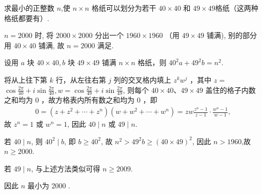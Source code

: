 \begin{example}
	求最小的正整数 $n$,使 $n \times n$ 格纸可以划分为若干 $40 \times 40$ 和 $49 \times 49$格纸（这两种格纸都要有）.
\end{example}
\begin{solution}
	$n=2000$ 时, 将 $2000 \times 2000$ 分出一个 $1960 \times 1960$ （用 $49 \times 49$ 铺满), 别的部分用 $40 \times 40$ 铺满, 故 $n=2000$ 满足.

	设用 $a$ 块 $40 \times 40, b$ 块 $49 \times 49$ 铺满 $n \times n$ 格纸，则 $40^2 a+49^2 b=n^2$.

	将从上往下第 $k$ 行，从左往右第 $j$ 列的交叉格内填上 $z^k w^j$ ，其中 $z=$ $\cos \frac{2 \pi}{40}+i \sin \frac{2 \pi}{40}, w=\cos \frac{2 \pi}{49}+i \sin \frac{2 \pi}{49}$, 则每个 $40 \times 40 、 49 \times 49$ 盖住的格子内数之和均为 0 ，故方格表内所有数之和均为 0 ，即
	\begin{align*}
		0=\left(z+z^2+\cdots+z^n\right)\left(w+w^2+\cdots+w^n\right)=z w \frac{z^n-1}{z-1} \cdot \frac{w^n-1}{w-1},
	\end{align*}
	故 $z^n=1$ 或 $w^n=1$, 因此 $40 \mid n$ 或 $49 \mid n$.

	若 $40 \mid n$, 则 $40^2 \mid b$, 即 $b \geqslant 40^2$, 故 $n^2>49^2 b \geqslant(40 \times 49)^2$, 因此 $n>1960$,故 $n \geqslant 2000$.

	若 $49 \mid n$, 与上述方法类似可得 $n \geqslant 2009$.

	因此 $n$ 最小为 2000 .
\end{solution}

